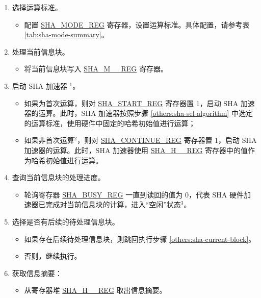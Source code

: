 \documentclass[main\_\_CN.tex]{subfiles}
\begin{document}
\begin{enumerate}
    \item \label{others:sha-sel-algorithm} 选择运算标准。
    \begin{itemize}
        \item 配置 \hyperref[regdesc:SHAMODEREG]{SHA\_MODE\_REG} 寄存器，设置运算标准。具体配置，请参考表 \ref{tab:sha-mode-summary}。
    \end{itemize}
    \item \label{others:sha-current-block} 处理当前信息块。
    \begin{itemize}
        \item 将当前信息块写入 \hyperref[regdesc:SHAMNREG]{SHA\_M\_\_REG} 寄存器。
    \end{itemize}
    \item 启动 SHA 加速器 \hyperref[others:sha-note-typical-sha]{$^1$}。
            \begin{itemize}
                \item 如果为首次运算，则对 \hyperref[regdesc:SHASTARTREG]{SHA\_START\_REG} 寄存器置 1，启动 SHA 加速器的运算。此时，SHA 加速器按照步骤 \ref{others:sha-sel-algorithm} 中选定的运算标准，使用硬件中固定的哈希初始值进行运算；
                \item 如果非首次运算\hyperref[others:sha-note-typical-sha]{$^2$}，则对 \hyperref[regdesc:SHACONTINUEREG]{SHA\_CONTINUE\_REG} 寄存器置 1，启动 SHA 加速器的运算。此时，SHA 加速器使用 \hyperref[regdesc:SHAHNREG]{SHA\_H\_\_REG} 寄存器中的值作为哈希初始值进行运算。
            \end{itemize}
    \item 查询当前信息块的处理进度。
    \begin{itemize}
        \item 轮询寄存器 \hyperref[regdesc:SHABUSYREG]{SHA\_BUSY\_REG} 一直到读回的值为 0，代表 SHA 硬件加速器已完成对当前信息块的计算，进入“空闲”状态\hyperref[others:sha-note-typical-sha]{$^3$}。
    \end{itemize}

    \item 选择是否有后续的待处理信息块。
    \begin{itemize}
        \item 如果存在后续待处理信息块，则跳回执行步骤 \ref{others:sha-current-block}。
        \item 否则，继续执行。
    \end{itemize}
    \item 获取信息摘要：
    \begin{itemize}
        \item 从寄存器堆 \hyperref[regdesc:SHAHNREG]{SHA\_H\_\_REG} 取出信息摘要。
    \end{itemize}
\end{enumerate}
\end{document}
